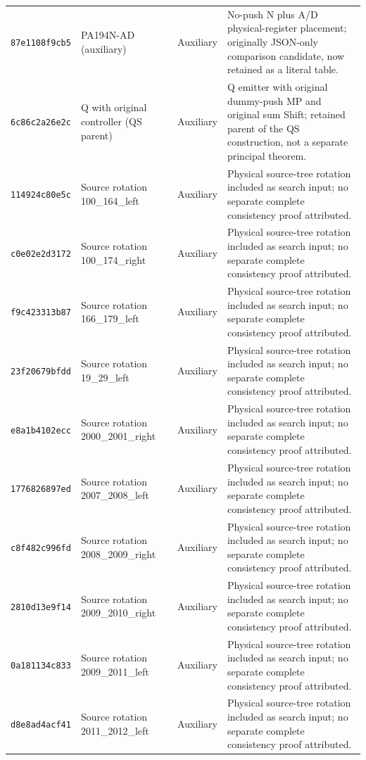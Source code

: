 {\begin{longtable}{@{}>{\raggedright\arraybackslash}p{}>{\raggedright\arraybackslash}p{}>{\raggedright\arraybackslash}p{}>{\raggedright\arraybackslash}p{}@{}}
\texttt{87e1108f9cb5} & PA194N-AD (auxiliary) & Auxiliary & No-push N plus A/D physical-register placement; originally JSON-only comparison candidate, now retained as a literal table.\\[3pt]
\texttt{6c86c2a26e2c} & Q with original controller (QS parent) & Auxiliary & Q emitter with original dummy-push MP and original sum Shift; retained parent of the QS construction, not a separate principal theorem.\\[3pt]
\texttt{114924c80e5c} & Source rotation 100\_164\_left & Auxiliary & Physical source-tree rotation included as search input; no separate complete consistency proof attributed.\\[3pt]
\texttt{c0e02e2d3172} & Source rotation 100\_174\_right & Auxiliary & Physical source-tree rotation included as search input; no separate complete consistency proof attributed.\\[3pt]
\texttt{f9c423313b87} & Source rotation 166\_179\_left & Auxiliary & Physical source-tree rotation included as search input; no separate complete consistency proof attributed.\\[3pt]
\texttt{23f20679bfdd} & Source rotation 19\_29\_left & Auxiliary & Physical source-tree rotation included as search input; no separate complete consistency proof attributed.\\[3pt]
\texttt{e8a1b4102ecc} & Source rotation 2000\_2001\_right & Auxiliary & Physical source-tree rotation included as search input; no separate complete consistency proof attributed.\\[3pt]
\texttt{1776826897ed} & Source rotation 2007\_2008\_left & Auxiliary & Physical source-tree rotation included as search input; no separate complete consistency proof attributed.\\[3pt]
\texttt{c8f482c996fd} & Source rotation 2008\_2009\_right & Auxiliary & Physical source-tree rotation included as search input; no separate complete consistency proof attributed.\\[3pt]
\texttt{2810d13e9f14} & Source rotation 2009\_2010\_right & Auxiliary & Physical source-tree rotation included as search input; no separate complete consistency proof attributed.\\[3pt]
\texttt{0a181134c833} & Source rotation 2009\_2011\_left & Auxiliary & Physical source-tree rotation included as search input; no separate complete consistency proof attributed.\\[3pt]
\texttt{d8e8ad4acf41} & Source rotation 2011\_2012\_left & Auxiliary & Physical source-tree rotation included as search input; no separate complete consistency proof attributed.\\[3pt]

\end{longtable}}
